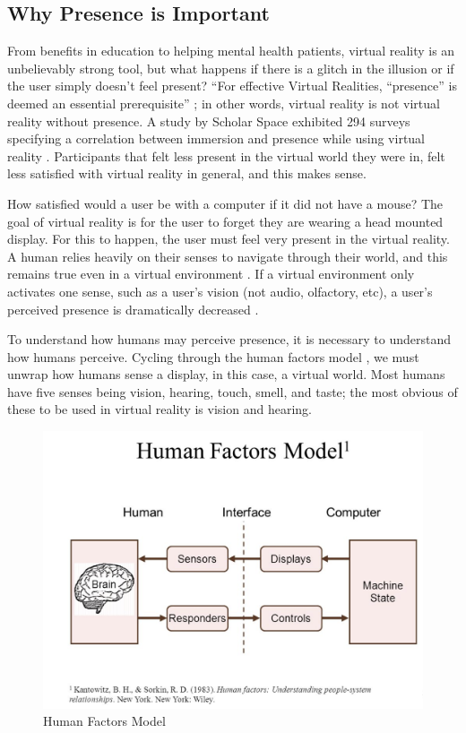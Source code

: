 \documentclass[manuscript,screen,review]{acmart}
\begin{document}
\subsection{Why Presence is Important}
From benefits in education to helping mental health patients, virtual reality is an unbelievably strong tool, but what happens if there is a glitch in the illusion or if the user simply doesn't feel present? “For effective Virtual Realities, “presence” is deemed an essential prerequisite” \cite{KERN}; in other words, virtual reality is not virtual reality without presence. A study by Scholar Space exhibited 294 surveys specifying a correlation between immersion and presence while using virtual reality \cite{Mütterlein}. Participants that felt less present in the virtual world they were in, felt less satisfied with virtual reality in general, and this makes sense. 

How satisfied would a user be with a computer if it did not have a mouse? The goal of virtual reality is for the user to forget they are wearing a head mounted display. For this to happen, the user must feel very present in the virtual reality. A human relies heavily on their senses to navigate through their world, and this remains true even in a virtual environment \cite{JELFS}. If a virtual environment only activates one sense, such as a user’s vision (not audio, olfactory, etc), a user’s perceived presence is dramatically decreased \cite{BRINKMAN, JELFS}.

To understand how humans may perceive presence, it is necessary to understand how humans perceive. Cycling through the human factors model \cite{MACKENZIE}, we must unwrap how humans sense a display, in this case, a virtual world. Most humans have five senses being vision, hearing, touch, smell, and taste; the most obvious of these to be used in virtual reality is vision and hearing. 

\begin{figure}[ht]
  \centering
  \includegraphics[width=\linewidth]{HumanFactorsModel.png}
  \caption{Human Factors Model \cite{MACKENZIE}}
\end{figure}
\end{document}
